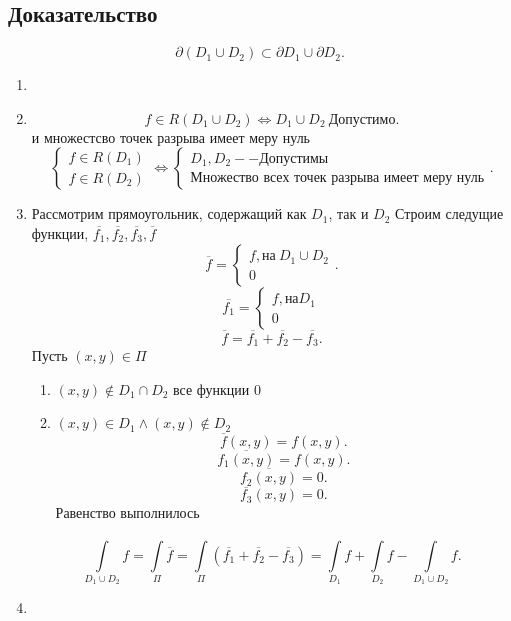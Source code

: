 \documentclass[14pt]{extarticle} \usepackage{fontspec}
\begin{document}
    \subsection{Доказательство}
    \[
        \partial(D_1 \cup D_2) \subset \partial D_1 \cup \partial D_2
    .\] 
    \begin{enumerate}
        \item 
        \item 
            \[
                f \in R(D_1 \cup D_2) \iff D_1 \cup D_2 ~\text{Допустимо}
            .\] 
            и множестсво точек разрыва имеет меру нуль
            \[
            \begin{cases}
                f \in R(D_1)\\
                f \in R(D_2)
            \end{cases}
            \iff 
            \begin{cases}
                D_1,D_2 -- \text{Допустимы}\\
                \text{Множество всех точек разрыва имеет меру нуль}
            \end{cases}
            .\] 
            \item
            Рассмотрим прямоугольник, содержащий как $D_1$, так и $D_2$
            Строим следущие функции, $\overline{f_1},\overline{f_2},\overline{f_3},\overline{f}$
            \[
            \overline{f} = 
            \begin{cases}
                f, \text{на} ~ D_1 \cup D_2\\
                0 
            \end{cases}
            .\] 
            \[
            \overline{f_1} = 
            \begin{cases}
                f, \text{на} D_1\\
                0
            \end{cases}
        \]
        \[
    \overline{f} = \overline{f_1} + \overline{f_2} - \overline{f_3}
        .\] 
        Пусть $(x,y) \in \Pi$
         \begin{enumerate}
            \item $(x,y) \notin D_1 \cap D_2$ все функции 0
            \item $(x,y) \in D_1 \land (x,y) \notin D_2$
                \[
                \overline{f}(x,y) = f(x,y)
                .\] 
                \[
                \overline{f_1(x,y)} = f(x,y)
                .\] 
                \[
                \overline{f_2(x,y)} = 0
                .\] 
                \[
                \overline{f_3}(x,y) = 0
                .\] 
                Равенство выполнилось
        \end{enumerate}
        \[
        \int\limits_{D_1 \cup D_2}^{} f = \int\limits_{\Pi}^{} \overline{f} =
        \int\limits_{\Pi}^{}  (\overline{f_1} + \overline{f_2} - \overline{f_3}) =
        \int\limits_{D_1}^{} f +  \int\limits_{D_2}^{} f - \int\limits_{D_1 \cup D_2}^{} f  
        .\] 
        \item
    \end{enumerate}
\end{document}
